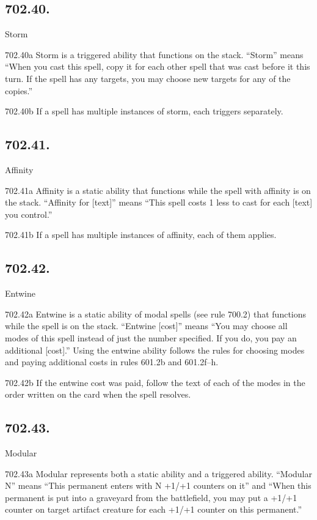 \subsection*{702.40.}
Storm

702.40a Storm is a triggered ability that functions on the stack. “Storm” means “When you cast this spell, copy it for each other spell that was cast before it this turn. If the spell has any targets, you may choose new targets for any of the copies.”

702.40b If a spell has multiple instances of storm, each triggers separately.

\subsection*{702.41.}
Affinity

702.41a Affinity is a static ability that functions while the spell with affinity is on the stack. “Affinity for [text]” means “This spell costs {1} less to cast for each [text] you control.”

702.41b If a spell has multiple instances of affinity, each of them applies.

\subsection*{702.42.}
Entwine

702.42a Entwine is a static ability of modal spells (see rule 700.2) that functions while the spell is on the stack. “Entwine [cost]” means “You may choose all modes of this spell instead of just the number specified. If you do, you pay an additional [cost].” Using the entwine ability follows the rules for choosing modes and paying additional costs in rules 601.2b and 601.2f–h.

702.42b If the entwine cost was paid, follow the text of each of the modes in the order written on the card when the spell resolves.

\subsection*{702.43.}
Modular

702.43a Modular represents both a static ability and a triggered ability. “Modular N” means “This permanent enters with N +1/+1 counters on it” and “When this permanent is put into a graveyard from the battlefield, you may put a +1/+1 counter on target artifact creature for each +1/+1 counter on this permanent.”

